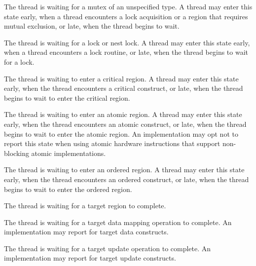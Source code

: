 \begin{description}

\item {}

  The thread is waiting for a mutex of an unspecified type. A 
  thread may enter this state early, when a thread encounters a lock acquisition or a region that requires mutual exclusion, or late, when the thread begins to wait.

\item {}

  The thread is waiting for a  lock  or nest lock. A 
  thread may enter this state early, when a thread
  encounters a lock  routine, or late, when the thread
  begins to wait for a lock.

\item {} 

  The thread is waiting to enter a critical region. A 
  thread may enter this state early, when the
  thread encounters a critical construct, or late, when the thread
  begins to wait to enter the critical region. 


\item {} 

  The thread is waiting to enter an atomic region. A 
  thread may enter this state early, when the thread
  encounters an atomic construct, or late, when the thread begins
  to wait to enter the atomic region. 
  An implementation may opt not to report
  this state when using atomic hardware instructions that support non-blocking atomic implementations.
  

\item {} 

  The thread is waiting to enter an ordered region. A 
  thread may enter this state early, when the thread encounters
  an ordered construct, or late, when the thread begins
  to wait to enter the ordered region. 
  
\end{description}
  

\begin{description}

\item {} 

  The thread is waiting for a target region to complete.
  
\item {} 

  The thread is waiting for a target data mapping operation to complete. 
  An implementation may report  
  for target data constructs.

\item {} 

  The thread is waiting for a target  update operation to complete. 
  An implementation may report  
  for target update constructs.

\end{description}


